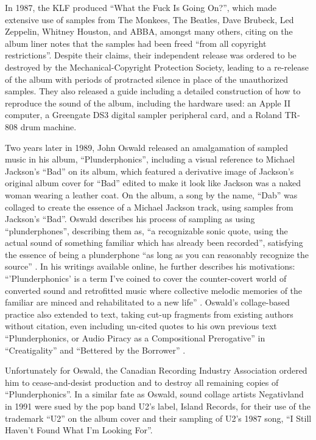 \documentclass[a4paper,11pt,final]{ThesisStyle}
\begin{document}
In 1987, the KLF produced ``What the Fuck Is Going On?'', which made extensive use of samples from The Monkees, The Beatles, Dave Brubeck, Led Zeppelin, Whitney Houston, and ABBA, amongst many others, citing on the album liner notes that the samples had been freed ``from all copyright restrictions''.  Despite their claims, their independent release was ordered to be destroyed by the Mechanical-Copyright Protection Society, leading to a re-release of the album with periods of protracted silence in place of the unauthorized samples.  They also released a guide including a detailed construction of how to reproduce the sound of the album, including the hardware used: an Apple II computer, a Greengate DS3 digital sampler peripheral card, and a Roland TR-808 drum machine.  

Two years later in 1989, John Oswald released an amalgamation of sampled music in his album, ``Plunderphonics'', including a visual reference to Michael Jackson's ``Bad'' on its album, which featured a derivative image of Jackson's original album cover for ``Bad'' edited to make it look like Jackson was a naked woman wearing a leather coat.  On the album, a song by the name, ``Dab''  was collaged to create the essence of a Michael Jackson track, using samples from Jackson's ``Bad''.  Oswald describes his process of sampling as using ``plunderphones'', describing them as, ``a recognizable sonic quote, using the actual sound of something familiar which has already been recorded'', satisfying the essence of being a plunderphone ``as long as you can reasonably recognize the source'' \cite{OswaldInterviews}.  In his writings available online, he further describes his motivations: ``'Plunderphonics' is a term I've coined to cover the counter-covert world of converted sound and retrofitted music where collective melodic memories of the familiar are minced and rehabilitated to a new life'' \cite{Steenhuisen2005}.  Oswald's collage-based practice also extended to text, taking cut-up fragments from existing authors without citation, even including un-cited quotes to his own previous text ``Plunderphonics, or Audio Piracy as a Compositional Prerogative'' in ``Creatigality'' and ``Bettered by the Borrower'' \cite{Tholl}.   

Unfortunately for Oswald, the Canadian Recording Industry Association ordered him to cease-and-desist production and to destroy all remaining copies of ``Plunderphonics''.   In a similar fate as Oswald, sound collage artists Negativland in 1991 were sued by the pop band U2's label, Island Records, for their use of the trademark ``U2'' on the album cover and their sampling of U2's 1987 song, ``I Still Haven't Found What I'm Looking For''.   
\end{document}
